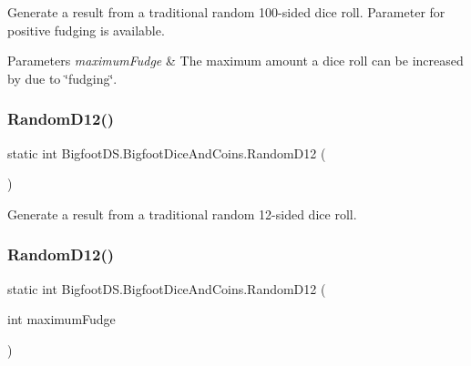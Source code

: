Generate a result from a traditional random 100-\/sided dice roll. Parameter for positive fudging is available. 


\begin{DoxyParams}{Parameters}
{\em maximum\+Fudge} & The maximum amount a dice roll can be increased by due to \char`\"{}fudging\char`\"{}.\\
\hline
\end{DoxyParams}
\mbox{\label{class_bigfoot_d_s_1_1_bigfoot_dice_and_coins_a76b2cdf34cf16d0d6111c4fa1fee99aa}} 
\subsubsection{\texorpdfstring{Random\+D12()}{RandomD12()}\hspace{0.1cm}{\footnotesize\ttfamily [1/2]}}
{\footnotesize\ttfamily static int Bigfoot\+D\+S.\+Bigfoot\+Dice\+And\+Coins.\+Random\+D12 (\begin{DoxyParamCaption}{ }\end{DoxyParamCaption})\hspace{0.3cm}{\ttfamily [static]}}



Generate a result from a traditional random 12-\/sided dice roll. 

\mbox{\label{class_bigfoot_d_s_1_1_bigfoot_dice_and_coins_ade21521b65ed17ec599752440894da3c}} 
\subsubsection{\texorpdfstring{Random\+D12()}{RandomD12()}\hspace{0.1cm}{\footnotesize\ttfamily [2/2]}}
{\footnotesize\ttfamily static int Bigfoot\+D\+S.\+Bigfoot\+Dice\+And\+Coins.\+Random\+D12 (\begin{DoxyParamCaption}\item[{int}]{maximum\+Fudge }\end{DoxyParamCaption})\hspace{0.3cm}{\ttfamily [static]}}



